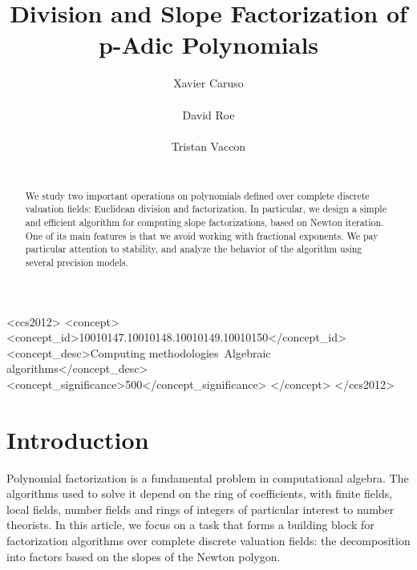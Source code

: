 \documentclass{sig-alternate-05-2015}
\title{Division and Slope Factorization of p-Adic Polynomials}
\author{
\alignauthor Xavier Caruso\\
  \affaddr{Universit\'e Rennes 1}\\
  \affaddr{xavier.caruso@normalesup.org}
\alignauthor David Roe \\
  \affaddr{University of Pittsburgh}\\
  \affaddr{roed.math@gmail.com}
\alignauthor Tristan Vaccon\\
  \affaddr{JSPS--Rikkyo University}\\
  \affaddr{vaccon@rikkyo.ac.jp}
}
\newcommand{\RS}{\text{\rm RS}}
\theoremstyle{definition}
\begin{document}
\maketitle

\begin{abstract}
We study two important operations on polynomials defined over complete 
discrete valuation fields: Euclidean division and factorization. In particular,
we design a simple and efficient algorithm for computing slope factorizations,
based on Newton iteration.  One of its main features is that we avoid working
with fractional exponents.
We pay particular attention to stability, and analyze the behavior
of the algorithm using several precision models.
\end{abstract}

\begin{CCSXML}
<ccs2012>
<concept>
<concept_id>10010147.10010148.10010149.10010150</concept_id>
<concept_desc>Computing methodologies~Algebraic algorithms</concept_desc>
<concept_significance>500</concept_significance>
</concept>
</ccs2012>
\end{CCSXML}

\vspace{-1.5mm}

%
%

\section{Introduction}

Polynomial factorization is a fundamental problem in computational algebra.
The algorithms used to solve it depend on the ring of coefficients, with finite fields,
local fields, number fields and rings of integers of particular interest to number theorists.
In this article, we focus on a task that forms a building block for factorization
algorithms over complete discrete valuation fields: the decomposition into factors based on the
slopes of the Newton polygon.
\end{document}
